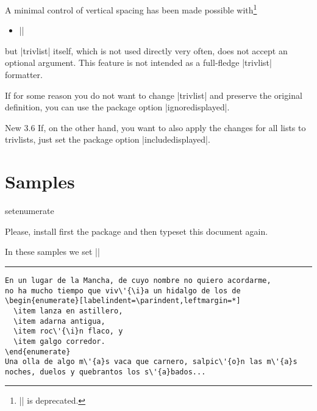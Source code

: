 \documentclass[a4paper]{ltxguide}
\newcommand\New[1]{%
  \colorbox[rgb]{.87, .9, .83}{New #1}\enspace\ignorespaces}
\begin{document}
A minimal control of vertical spacing has been made possible 
with\footnote{|\string\setdisplayed| is deprecated.}
\begin{itemize}
\item ||
\end{itemize}
but |trivlist| itself, which is not used directly very often, does not
accept an optional argument. This feature is not intended as a
full-fledge |trivlist| formatter.

If for some reason you do not want to change |trivlist| and preserve
the original definition, you can use the package option
|ignoredisplayed|.

\New{3.6} If, on the other hand, you want to also apply the changes for
all lists to trivlists, just set the package option |includedisplayed|.

\section{Samples}

\expandafter\ifx\csname setenumerate\endcsname\relax

Please, install first the package and then typeset this document again.

\else

In these samples we set ||

\small

\newcommand{\newsample}{\vskip6pt\goodbreak\hrule height 1pt\vskip6pt}
\newcommand{\samplesep}{\vskip6pt\goodbreak\hrule\vskip6pt}
\newbox\vsep
\setbox\vsep\hbox{\vrule height 2ex depth 16ex width 1pt}
\dp{}
\newcommand\showsep{\leavevmode\llap{\copy\vsep}}

\newsample

\begin{verbatim}
En un lugar de la Mancha, de cuyo nombre no quiero acordarme,
no ha mucho tiempo que viv\'{\i}a un hidalgo de los de
\begin{enumerate}[labelindent=\parindent,leftmargin=*]
  \item lanza en astillero,
  \item adarna antigua,
  \item roc\'{\i}n flaco, y
  \item galgo corredor.
\end{enumerate}
Una olla de algo m\'{a}s vaca que carnero, salpic\'{o}n las m\'{a}s
noches, duelos y quebrantos los s\'{a}bados...
\end{verbatim}
\end{document}
